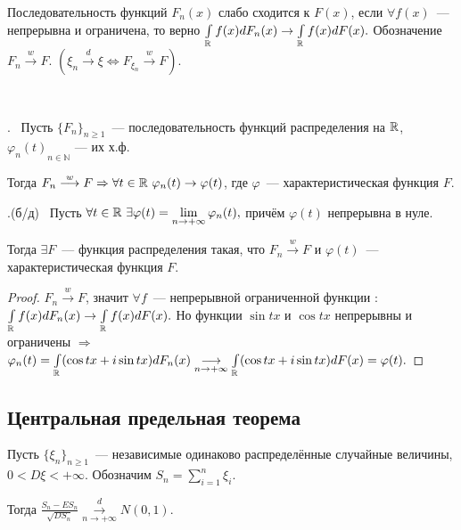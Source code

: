 	\begin{definition}
		Последовательность функций \(F_n(x)\) слабо сходится к \(F(x)\), если \(\forall f(x)\)~---  непрерывна и ограничена, то верно \(\int\limits_{\mathbb{R}} f(x) dF_n(x) \to \int\limits_{\mathbb{R}} f(x)dF(x).\) Обозначение \(F_n \overset{w}{\longrightarrow}F.\)
		\((\xi_n \overset{d}{\longrightarrow}\xi \Leftrightarrow F_{\xi_n} \overset{w}{\longrightarrow}F).\)
	\end{definition}
	\begin{theorem}~~~~~~~~~~~~~~~~~~~~~~~~~~~~~~~~~~~~~~~~~

		. ~Пусть \(\{F_n\}_{n \geqslant 1}\)~--- последовательность функций распределения на \(\mathbb{R}\), \({\varphi_n(t)}_{n \in \mathbb{N}}\) --- их х.ф. 
		
		Тогда  \(F_n \overset{w}{\longrightarrow}F \Rightarrow \forall t \in \mathbb{R}~\varphi_n(t) \to \varphi(t)\), где \(\varphi\)~--- характеристическая функция \(F\).
		
		.(б/д)~ Пусть \(\forall t \in \mathbb{R} ~ \exists \varphi(t) = \lim\limits_{n \to +\infty} \varphi_n(t), \) причём \(\varphi(t)\) непрерывна в нуле. 
		
		Тогда \(\exists F\)~--- функция распределения такая, что \(F_n \overset{w}{\longrightarrow}F\) и \(\varphi(t)\)~---характеристическая функция \(F\).
	\end{theorem}

	\begin{proof}
		\(F_n \overset{w}{\longrightarrow} F \), значит \(\forall f\)~--- непрерывной ограниченной функции : \(\int\limits_{\mathbb{R}} f(x)dF_n(x) \to \int\limits_{\mathbb{R}} f(x)dF(x).\) Но функции \(\sin tx \) и \(\cos tx\) непрерывны и ограничены \(\Rightarrow\) \(\varphi_n(t) = \int\limits_{\mathbb{R}} (\cos tx + i\sin tx)dF_n(x) \underset{n \to +\infty}{\longrightarrow} \int\limits_{\mathbb{R}} (\cos tx + i\sin tx)dF(x) = \varphi(t).\)
	\end{proof}

	\subsection{Центральная предельная теорема}
	\begin{theorem}
		Пусть \(\{\xi_n\}_{n\geqslant 1}\)~--- независимые одинаково распределённые случайные величины, \(0 < D\xi < +\infty.\)
		Обозначим \(S_n = \sum\limits_{i = 1}^{n}\xi_i.\) 
		
		Тогда 
		\(\frac{S_n - ES_n}{\sqrt{DS_n}} \overset{d}{\underset{n \to +\infty}{\longrightarrow}}N(0, 1).\)
	\end{theorem}

